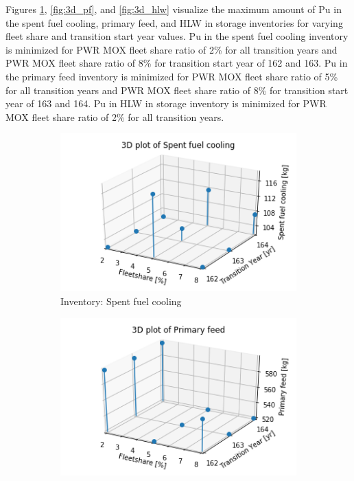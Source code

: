 Figures \ref{fig:3d_sfc}, \ref{fig:3d_pf}, and \ref{fig:3d_hlw}
visualize the maximum amount of Pu in the spent fuel cooling, 
primary feed, and \gls{HLW} in storage inventories for varying 
fleet share and transition start year values. 
Pu in the spent fuel cooling inventory is minimized for PWR MOX
fleet share ratio of 2\% for all transition years
and PWR MOX fleet share ratio of 8\% for 
transition start year of 162 and 163.  
Pu in the primary feed inventory is minimized for PWR MOX
fleet share ratio of 5\% for all transition years and PWR MOX 
fleet share ratio of 8\% for 
transition start year of 163 and 164.                       
Pu in HLW in storage inventory is minimized for PWR MOX
fleet share ratio of 2\% for all transition years. 

\begin{figure}[]
    \centering
    \begin{subfigure}[t]{\textwidth}
    \centering
        \includegraphics[width=0.58\linewidth]{figures/3d_sfc} 
        \caption{Inventory: Spent fuel cooling}
        \label{fig:3d_sfc}
    \end{subfigure}
    \begin{subfigure}[t]{0.58\textwidth}
        \centering
        \includegraphics[width=\linewidth]{figures/3d_pf} 

\end{subfigure}
\end{figure}
